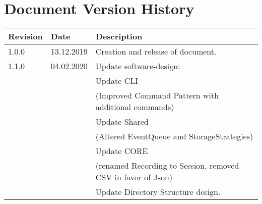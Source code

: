 \chapter*{Document Version History}
\label{ch:versionhistory}
\begin{table}[h]
\begin{tabular}{lll}
\textbf{Revision} & \textbf{Date} & \textbf{Description}              \\
\hline
1.0.0             & 13.12.2019    & Creation and release of document. \\
\hline
1.1.0			  & 04.02.2020	  & Update software-design: \\
&& Update CLI \\
&& (Improved Command Pattern with additional commands) \\
&& Update Shared \\
&& (Altered EventQueue and StorageStrategies) \\
&& Update CORE \\
&& (renamed Recording to Session, removed CSV in favor of Json) \\
&& Update Directory Structure design. \\                                                          
\end{tabular}
\end{table}